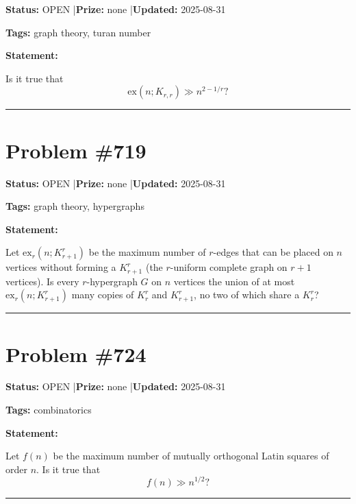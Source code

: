 \documentclass{article}
\begin{document}
\noindent\textbf{Status:} OPEN \quad|\quad \textbf{Prize:} none \quad|\quad \textbf{Updated:} 2025-08-31

\noindent\textbf{Tags:} graph theory, turan number

\medskip

\noindent\textbf{Statement:}

Is it true that\[\mathrm{ex}(n; K_{r,r}) \gg n^{2-1/r}?\]

\noindent\rule{\linewidth}{0.4pt}


\section{Problem \#719}
\label{prob:719}

\noindent\textbf{Status:} OPEN \quad|\quad \textbf{Prize:} none \quad|\quad \textbf{Updated:} 2025-08-31

\noindent\textbf{Tags:} graph theory, hypergraphs

\medskip

\noindent\textbf{Statement:}

Let $\mathrm{ex}_r(n;K_{r+1}^r)$ be the maximum number of $r$-edges that can be placed on $n$ vertices without forming a $K_{r+1}^r$ (the $r$-uniform complete graph on $r+1$ vertices). Is every $r$-hypergraph $G$ on $n$ vertices the union of at most $\mathrm{ex}_{r}(n;K_{r+1}^r)$ many copies of $K_r^r$ and $K_{r+1}^r$, no two of which share a $K_r^r$?

\noindent\rule{\linewidth}{0.4pt}


\section{Problem \#724}
\label{prob:724}

\noindent\textbf{Status:} OPEN \quad|\quad \textbf{Prize:} none \quad|\quad \textbf{Updated:} 2025-08-31

\noindent\textbf{Tags:} combinatorics

\medskip

\noindent\textbf{Statement:}

Let $f(n)$ be the maximum number of mutually orthogonal Latin squares of order $n$. Is it true that\[f(n) \gg n^{1/2}?\]

\noindent\rule{\linewidth}{0.4pt}


\end{document}

